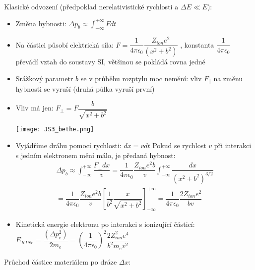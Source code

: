 \documentclass[../../main.tex]{subfiles}
\begin{document}
Klasické odvození (předpoklad nerelativistické rychlosti a $\Delta E \ll E$):
\begin{itemize}
	\item Změna hybnosti: $\Delta p_b \approx \int_{- \infty}^{+ \infty} F dt$
	\item Na částici působí elektrická síla: $F = \dfrac{1}{4 \pi \epsilon_0} \dfrac{Z_{ion} e^2}{(x^2 + b^2)}$ , konstanta $\dfrac{1}{4 \pi \epsilon_0} $ převádí vztah do soustavy SI, většinou se pokládá rovna jedné
	\item Srážkový parametr $b$ se v průběhu rozptylu moc nemění: vliv $F_\parallel$ na změnu hybnosti se vyruší (druhá půlka vyruší první)
	\item Vliv má jen: $F_\perp = F \dfrac{b}{\sqrt{x^2 + b^2}}$
	
	\begin{center}
		\texttt{[image: JS3\_bethe.png]}
	\end{center}

	\item Vyjádříme dráhu pomocí rychlosti: $dx = v dt$ 
	Pokud se rychlost $v$ při interakci s jedním elektronem mění málo, je předaná hybnost:
	\begin{equation}
	\begin{gathered}
	\Delta p_b \approx \int_{- \infty}^{+ \infty} \dfrac{F_\perp dx}{v} =  \dfrac{1}{4 \pi \epsilon_0} \dfrac{Z_{ion} e^2 b}{v} \int_{- \infty}^{+ \infty} \dfrac{dx}{(x^2 + b^2)^{3/2}} \\ =  \dfrac{1}{4 \pi \epsilon_0} \dfrac{Z_{ion} e^2 b}{v} \left[ \dfrac{1}{b^2} \dfrac{x}{\sqrt{x^2 + b^2}}\right]_{- \infty}^{+ \infty} = \dfrac{1}{4 \pi \epsilon_0} \dfrac{2 Z_{ion} e^2}{bv}
	\end{gathered}
	\end{equation}
	\item Kinetická energie elektronu po interakci s ionizující částicí:  $E_{KINe} = \dfrac{(\Delta p_{e}^{2})}{2 m_e} = \left( \dfrac{1}{4 \pi \epsilon_0} \right) ^2 \dfrac{2 Z_{ion}^{2}e^4 }{b^2 m_e v^2}$
\end{itemize}
	
Průchod částice materiálem po dráze $\Delta x$:
\end{document}
